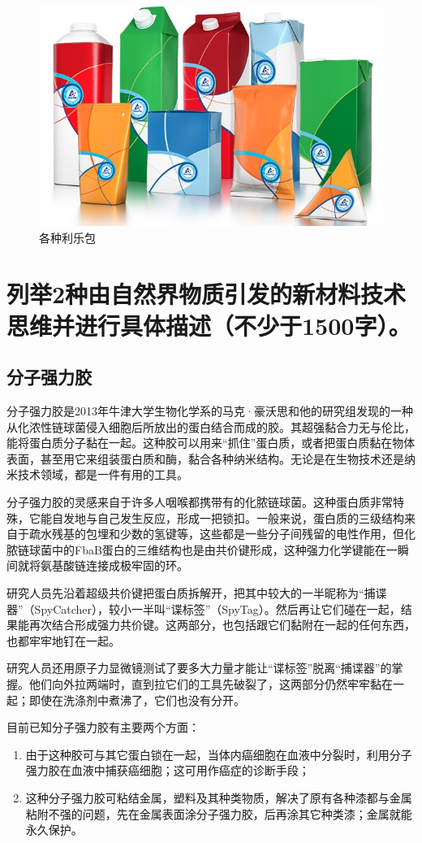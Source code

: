 \documentclass[UTF8,9pt]{ctexart}
\newcommand\se{\section}                                               %
\newcommand\sub{\subsection}                                           %
\newcommand{\rk}[1]{\begin{enumerate}                              %
        #1
    \end{enumerate}}
\begin{document}
\begin{figure}[htbp]
    \centering
    \includegraphics[scale=0.35]{20.jpeg}
    \caption{各种利乐包}
\end{figure}

\se{列举2种由自然界物质引发的新材料技术思维并进行具体描述（不少于1500字）。}
\sub{分子强力胶}
分子强力胶是2013年牛津大学生物化学系的马克·豪沃思和他的研究组发现的一种从化浓性链球菌侵入细胞后所放出的蛋白结合而成的胶。其超强黏合力无与伦比，能将蛋白质分子黏在一起。这种胶可以用来“抓住”蛋白质，或者把蛋白质黏在物体表面，甚至用它来组装蛋白质和酶，黏合各种纳米结构。无论是在生物技术还是纳米技术领域，都是一件有用的工具。

分子强力胶的灵感来自于许多人咽喉都携带有的化脓链球菌。这种蛋白质非常特殊，它能自发地与自己发生反应，形成一把锁扣。一般来说，蛋白质的三级结构来自于疏水残基的包埋和少数的氢键等，这些都是一些分子间残留的电性作用，但化脓链球菌中的FbaB蛋白的三维结构也是由共价键形成，这种强力化学键能在一瞬间就将氨基酸链连接成极牢固的环。

研究人员先沿着超级共价键把蛋白质拆解开，把其中较大的一半昵称为“捕谍器”（SpyCatcher），较小一半叫“谍标签”（SpyTag）。然后再让它们碰在一起，结果能再次结合形成强力共价键。这两部分，也包括跟它们黏附在一起的任何东西，也都牢牢地钉在一起。

研究人员还用原子力显微镜测试了要多大力量才能让“谍标签”脱离“捕谍器”的掌握。他们向外拉两端时，直到拉它们的工具先破裂了，这两部分仍然牢牢黏在一起；即使在洗涤剂中煮沸了，它们也没有分开。

目前已知分子强力胶有主要两个方面：\rk{
    \item 由于这种胶可与其它蛋白锁在一起，当体内癌细胞在血液中分裂时，利用分子强力胶在血液中捕获癌细胞；这可用作癌症的诊断手段；
    \item 这种分子强力胶可粘结金属，塑料及其种类物质，解决了原有各种漆都与金属粘附不强的问题，先在金属表面涂分子强力胶，后再涂其它种类漆；金属就能永久保护。
}
\end{document}
